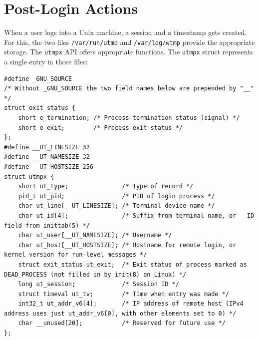 \documentclass[10pt,a4paper,titlepage,twoside,english,final]{zhawreprt}
\begin{document}
\section{Post-Login Actions}\label{sec:DesignPostLoginActions}
When a user logs into a \gls{Unix} machine, a session and a timestamp gets created.\\
For this, the two files \texttt{/var/run/utmp} and \texttt{/var/log/wtmp} provide the appropriate storage. The \texttt{utmpx} \gls{API} offers appropriate functions. The \texttt{utmpx} struct represents a single entry in those files:
\setlistingC
\begin{lstlisting}[caption={Definition of the utmpx structure {\citep[p.819]{KerriskTLPI}}},label=lst:UtmpxDefinition]
#define _GNU_SOURCE
/* Without _GNU_SOURCE the two field names below are prepended by "__" */
struct exit_status {
	short e_termination; /* Process termination status (signal) */
	short e_exit; 		 /* Process exit status */
};
#define __UT_LINESIZE 32
#define __UT_NAMESIZE 32
#define __UT_HOSTSIZE 256
struct utmpx {
	short ut_type; 				 /* Type of record */
	pid_t ut_pid; 				 /* PID of login process */
	char ut_line[__UT_LINESIZE]; /* Terminal device name */
	char ut_id[4]; 				 /* Suffix from terminal name, or	ID field from inittab(5) */
	char ut_user[__UT_NAMESIZE]; /* Username */
	char ut_host[__UT_HOSTSIZE]; /* Hostname for remote login, or kernel version for run-level messages */
	struct exit_status ut_exit;  /* Exit status of process marked as DEAD_PROCESS (not filled in by init(8) on Linux) */
	long ut_session; 			 /* Session ID */
	struct timeval ut_tv; 		 /* Time when entry was made */
	int32_t ut_addr_v6[4]; 		 /* IP address of remote host (IPv4 address uses just ut_addr_v6[0], with other elements set to 0) */
	char __unused[20]; 			 /* Reserved for future use */
};
\end{lstlisting}
\end{document}
